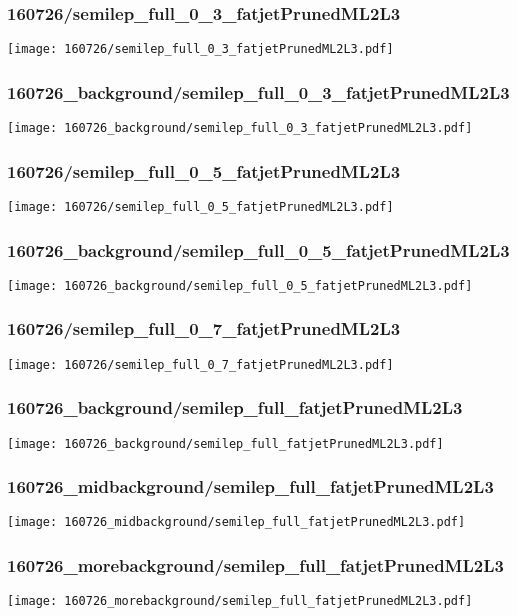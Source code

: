 \begin{frame}
   \frametitle{\small 160726/semilep\_full\_0\_3\_fatjetPrunedML2L3}
   \centering
   \texttt{[image: 160726/semilep\_full\_0\_3\_fatjetPrunedML2L3.pdf]}
\end{frame}

\begin{frame}
   \frametitle{\small 160726\_background/semilep\_full\_0\_3\_fatjetPrunedML2L3}
   \centering
   \texttt{[image: 160726\_background/semilep\_full\_0\_3\_fatjetPrunedML2L3.pdf]}
\end{frame}

\begin{frame}
   \frametitle{\small 160726/semilep\_full\_0\_5\_fatjetPrunedML2L3}
   \centering
   \texttt{[image: 160726/semilep\_full\_0\_5\_fatjetPrunedML2L3.pdf]}
\end{frame}

\begin{frame}
   \frametitle{\small 160726\_background/semilep\_full\_0\_5\_fatjetPrunedML2L3}
   \centering
   \texttt{[image: 160726\_background/semilep\_full\_0\_5\_fatjetPrunedML2L3.pdf]}
\end{frame}

\begin{frame}
   \frametitle{\small 160726/semilep\_full\_0\_7\_fatjetPrunedML2L3}
   \centering
   \texttt{[image: 160726/semilep\_full\_0\_7\_fatjetPrunedML2L3.pdf]}
\end{frame}

\begin{frame}
   \frametitle{\small 160726\_background/semilep\_full\_fatjetPrunedML2L3}
   \centering
   \texttt{[image: 160726\_background/semilep\_full\_fatjetPrunedML2L3.pdf]}
\end{frame}

\begin{frame}
   \frametitle{\small 160726\_midbackground/semilep\_full\_fatjetPrunedML2L3}
   \centering
   \texttt{[image: 160726\_midbackground/semilep\_full\_fatjetPrunedML2L3.pdf]}
\end{frame}

\begin{frame}
   \frametitle{\small 160726\_morebackground/semilep\_full\_fatjetPrunedML2L3}
   \centering
   \texttt{[image: 160726\_morebackground/semilep\_full\_fatjetPrunedML2L3.pdf]}
\end{frame}

